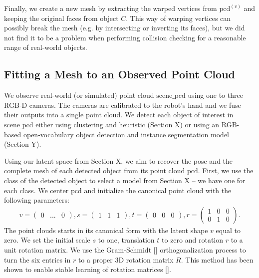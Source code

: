 \documentclass{article}
\newcommand{\pcx}[1]{\mathrm{pcd}^{(#1)}}
\begin{document}
Finally, we create a new mesh by extracting the warped vertices from $\pcx{v}$ and keeping the original faces from object $C$. This way of warping vertices can possibly break the mesh (e.g. by intersecting or inverting its faces), but we did not find it to be a problem when performing collision checking for a reasonable range of real-world objects.

\subsection{Fitting a Mesh to an Observed Point Cloud}
\label{sec:methods:scene}

We observe real-world (or simulated) point cloud $\mathrm{scene\_pcd}$ using one to three RGB-D cameras. The cameras are calibrated to the robot's hand and we fuse their outputs into a single point cloud. We detect each object of interest in $\mathrm{scene\_pcd}$ either using clustering and heuristic (Section X) or using an RGB-based open-vocabulary object detection and instance segmentation model (Section Y).

Using our latent space from Section X, we aim to recover the pose and the complete mesh of each detected object from its point cloud $\mathrm{pcd}$. First, we use the class of the detected object to select a model from Section X -- we have one for each class. We center $\mathrm{pcd}$ and initialize the canonical point cloud with the following parameters:
\begin{align}
    v = \begin{pmatrix} 0 & ... & 0 \end{pmatrix}, s = \begin{pmatrix} 1 & 1 & 1 \end{pmatrix}, t = \begin{pmatrix} 0 & 0 & 0 \end{pmatrix}, r = \begin{pmatrix} 1 & 0 & 0 \\ 0 & 1 & 0 \end{pmatrix}.
\end{align}
The point clouds starts in its canonical form with the latent shape $v$ equal to zero. We set the initial scale $s$ to one, translation $t$ to zero and rotation $r$ to a unit rotation matrix. We use the Gram-Schmidt [] orthogonalization process to turn the six entries in $r$ to a proper 3D rotation matrix $R$. This method has been shown to enable stable learning of rotation matrices [].
\end{document}
